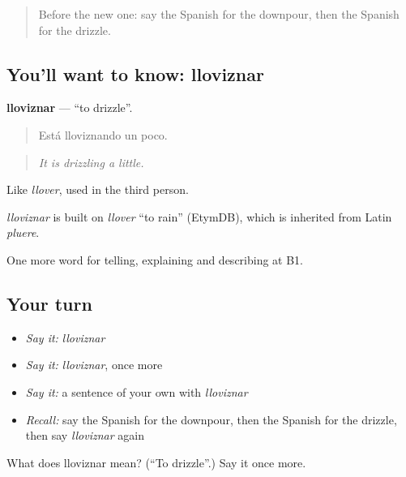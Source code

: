 \label{lesson:ES-C697-lloviznar}



\begin{quote}
Before the new one: say the Spanish for the downpour, then the Spanish for the drizzle.
\end{quote}

\subsection*{You'll want to know: lloviznar}
\textbf{lloviznar} — \textquotedblleft{}to drizzle\textquotedblright{}.

\begin{quote}
Está lloviznando un poco.
\end{quote}

\begin{quote}
\emph{It is drizzling a little.}
\end{quote}

Like \emph{llover}, used in the third person.

\begin{cousinweb}
\emph{lloviznar} is built on \emph{llover} \textquotedblleft{}to rain\textquotedblright{} (EtymDB), which is inherited from Latin \emph{pluere}.
\end{cousinweb}

\begin{grammarlens}[title={What you've built}]
One more word for telling, explaining and describing at B1.
\end{grammarlens}

\subsection*{Your turn}
\begin{itemize}
\raggedright
  \item \emph{Say it:} \emph{lloviznar}
  \item \emph{Say it:} \emph{lloviznar}, once more
  \item \emph{Say it:} a sentence of your own with \emph{lloviznar}
  \item \emph{Recall:} say the Spanish for the downpour, then the Spanish for the drizzle, then say \emph{lloviznar} again
\end{itemize}

\begin{tcolorbox}[breakable,colback=teal!4,colframe=teal!35!black,title={Before you move on}]
What does lloviznar mean? (\textquotedblleft{}To drizzle\textquotedblright{}.) Say it once more.
\end{tcolorbox}
